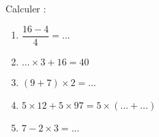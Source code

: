 
\begin{exercice}\label{exosmath-0830}

    Calculer :
    \begin{enumerate}
        \item
            \( \dfrac{ 16-4 }{ 4 }=\ldots\)
        \item
            \( \ldots \times 3+16=40\)
        \item
            \( (9+7)\times 2=\ldots\)
        \item
            \( 5\times 12+5\times 97=5\times(\ldots +\ldots)\)
        \item
            \( 7-2\times 3=\ldots\)
    \end{enumerate}


\end{exercice}
